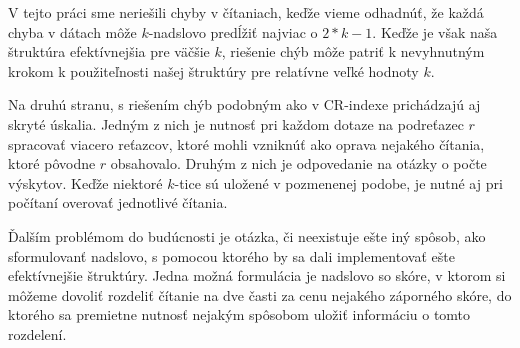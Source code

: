 V tejto práci sme neriešili chyby v čítaniach, keďže vieme odhadnúť, že každá
chyba v dátach môže $k$-nadslovo predĺžiť najviac o $2*k - 1$. Keďže je však
naša štruktúra efektívnejšia pre väčšie $k$, riešenie chýb môže patriť
k nevyhnutným krokom k použiteľnosti našej štruktúry pre relatívne veľké hodnoty $k$.

Na druhú stranu, s riešením chýb podobným ako v CR-indexe prichádzajú aj skryté úskalia. Jedným z nich
je nutnosť pri každom dotaze na podreťazec $r$ spracovať viacero reťazcov,
ktoré mohli vzniknúť ako oprava nejakého čítania, ktoré pôvodne $r$ obsahovalo.
Druhým z nich je odpovedanie na otázky o počte výskytov. Keďže niektoré $k$-tice
sú uložené v pozmenenej podobe, je nutné aj pri počítaní overovať jednotlivé
čítania.

Ďalším problémom do budúcnosti je otázka, či neexistuje ešte iný spôsob, ako
sformulovanť nadslovo, s pomocou ktorého by sa dali implementovať
ešte efektívnejšie štruktúry. Jedna možná formulácia je nadslovo so skóre,
v ktorom si môžeme dovoliť rozdeliť čítanie na dve časti za cenu nejakého
záporného skóre, do ktorého sa premietne nutnosť nejakým spôsobom uložiť
informáciu o tomto rozdelení.

